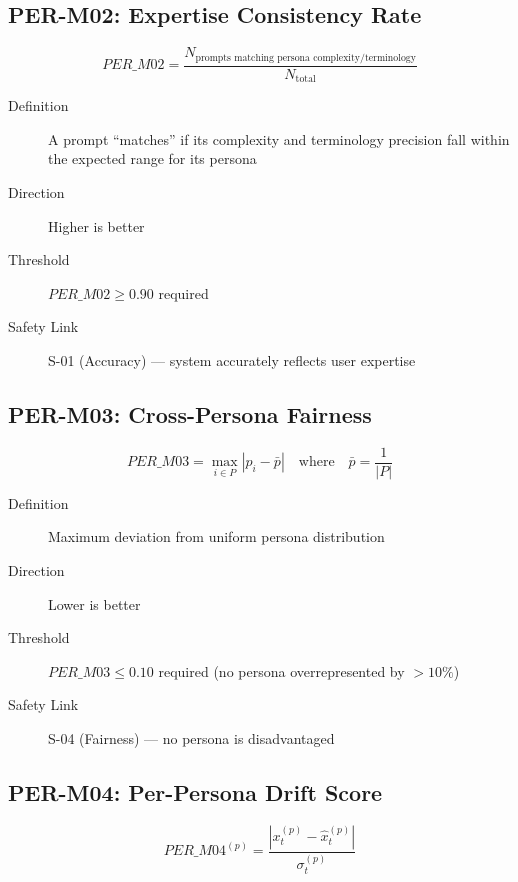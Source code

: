 \subsection{PER-M02: Expertise Consistency Rate}

\begin{equation}
\boxed{
PER\_M02 = \frac{N_{\text{prompts matching persona complexity/terminology}}}{N_{\text{total}}}
}
\end{equation}

\begin{description}
  \item[Definition] A prompt ``matches'' if its complexity and terminology precision
        fall within the expected range for its persona
  \item[Direction] Higher is better
  \item[Threshold] $PER\_M02 \geq 0.90$ required
  \item[Safety Link] S-01 (Accuracy) --- system accurately reflects user expertise
\end{description}

\subsection{PER-M03: Cross-Persona Fairness}

\begin{equation}
\boxed{
PER\_M03 = \max_{i \in P} |p_i - \bar{p}|
\quad \text{where} \quad
\bar{p} = \frac{1}{|P|}
}
\end{equation}

\begin{description}
  \item[Definition] Maximum deviation from uniform persona distribution
  \item[Direction] Lower is better
  \item[Threshold] $PER\_M03 \leq 0.10$ required (no persona overrepresented by $>10\%$)
  \item[Safety Link] S-04 (Fairness) --- no persona is disadvantaged
\end{description}

\subsection{PER-M04: Per-Persona Drift Score}

\begin{equation}
\boxed{
PER\_M04^{(p)} = \frac{|x_t^{(p)} - \hat{x}_t^{(p)}|}{\sigma_t^{(p)}}
}
\end{equation}

